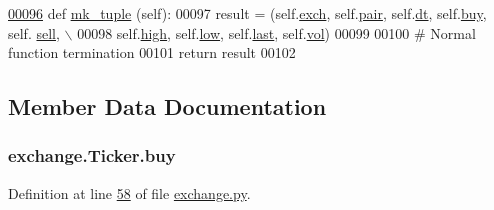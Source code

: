 \begin{DoxyCode}
\hypertarget{classexchange_1_1_ticker.tex_l00096}{}\hyperlink{classexchange_1_1_ticker_aba1398da3113a7ff17b2496ce92c7238}{00096}     \textcolor{keyword}{def }\hyperlink{classexchange_1_1_ticker_aba1398da3113a7ff17b2496ce92c7238}{mk\_tuple} (self): 
00097         result = (self.\hyperlink{classexchange_1_1_ticker_a33f33fe9a12da3ce52938afdc577c061}{exch}, self.\hyperlink{classexchange_1_1_ticker_a382f9199d13a7b5929a26065fad4e491}{pair}, self.\hyperlink{classexchange_1_1_ticker_a45e3162d9956cee797f21d93c44c6baf}{dt}, self.\hyperlink{classexchange_1_1_ticker_a2ca48c3fa9aba92241392a05bef39324}{buy}, self.
      \hyperlink{classexchange_1_1_ticker_a5ba9e257d2ed28f02528a37d9ebd793e}{sell}, \(\backslash\)
00098             self.\hyperlink{classexchange_1_1_ticker_aace381ca15468df6a40e8d86b7710a7f}{high}, self.\hyperlink{classexchange_1_1_ticker_a1c1f26a47a82fc799fcebf158e104405}{low}, self.\hyperlink{classexchange_1_1_ticker_add7c2d95fa790dcdffddae2e584ce5f5}{last}, self.\hyperlink{classexchange_1_1_ticker_a24c0dd396aebc54c06e429a68c964ea3}{vol})
00099             
00100         \textcolor{comment}{# Normal function termination }
00101         \textcolor{keywordflow}{return} result
00102         
\end{DoxyCode}


\subsection{Member Data Documentation}
\subsubsection[{\texorpdfstring{buy}{buy}}]{\setlength{\rightskip}{0pt plus 5cm}exchange.\+Ticker.\+buy}\hypertarget{classexchange_1_1_ticker_a2ca48c3fa9aba92241392a05bef39324}{}\label{classexchange_1_1_ticker_a2ca48c3fa9aba92241392a05bef39324}


Definition at line \hyperlink{exchange_8py_source_l00058}{58} of file \hyperlink{exchange_8py_source}{exchange.\+py}.



